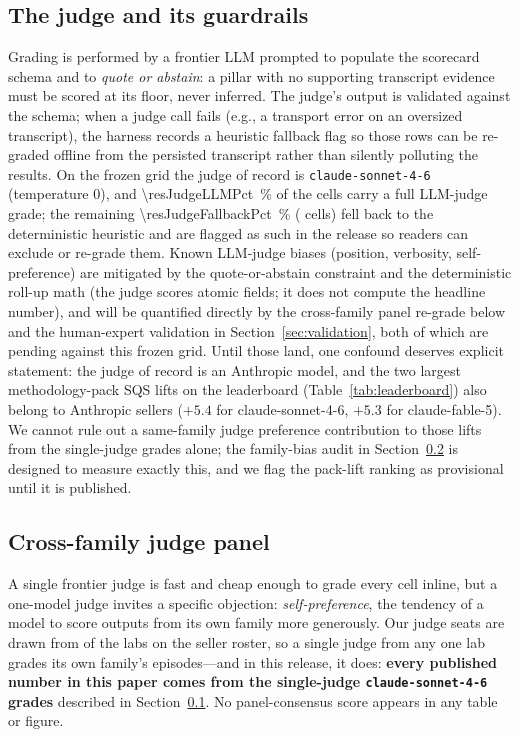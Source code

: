 \subsection{The judge and its guardrails}
\label{sec:judge}
Grading is performed by a frontier LLM prompted to populate the scorecard schema
and to \emph{quote or abstain}: a pillar with no supporting transcript evidence
must be scored at its floor, never inferred. The judge's output is validated
against the schema; when a judge call fails (e.g., a transport error on an
oversized transcript), the harness records a heuristic fallback flag so those rows
can be re-graded offline from the persisted transcript rather than silently
polluting the results. On the frozen grid the judge of record is
\texttt{claude-sonnet-4-6} (temperature $0$), and \SI{\resJudgeLLMPct}{\percent} of the
\resCellsComplete{} cells carry a full LLM-judge grade; the remaining
\SI{\resJudgeFallbackPct}{\percent} (\resJudgeFallbackCells{} cells) fell back to the deterministic heuristic and are
flagged as such in the release so readers can exclude or re-grade them.
Known LLM-judge biases (position, verbosity, self-preference) are mitigated by the
quote-or-abstain constraint and the deterministic roll-up math (the judge scores
atomic fields; it does not compute the headline number), and will be quantified
directly by the cross-family panel re-grade below and the human-expert validation
in Section~\ref{sec:validation}, both of which are pending against this frozen
grid. Until those land, one confound deserves explicit statement: the judge of
record is an Anthropic model, and the two largest methodology-pack SQS lifts on
the leaderboard (Table~\ref{tab:leaderboard}) also belong to Anthropic sellers
($+5.4$ for claude-sonnet-4-6, $+5.3$ for claude-fable-5). We cannot rule out a
same-family judge preference contribution to those lifts from the single-judge
grades alone; the family-bias audit in Section~\ref{sec:panel} is designed to
measure exactly this, and we flag the pack-lift ranking as provisional until it is
published.

\subsection{Cross-family judge panel}
\label{sec:panel}
A single frontier judge is fast and cheap enough to grade every cell inline, but a
one-model judge invites a specific objection: \emph{self-preference}, the tendency
of a model to score outputs from its own family more generously. Our judge seats are
drawn from \numJudgeLabs{} of the \numLabs{} labs on the seller roster, so a single judge from
any one lab grades its own family's episodes---and in this release, it does:
\textbf{every published number in this paper comes from the single-judge
\texttt{claude-sonnet-4-6} grades} described in Section~\ref{sec:judge}. No
panel-consensus score appears in any table or figure.

